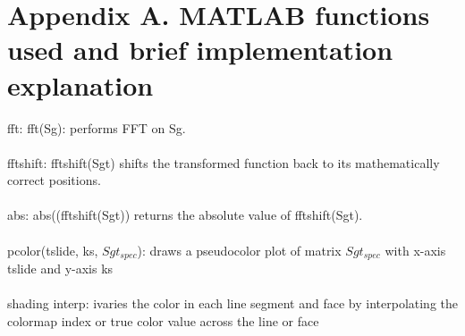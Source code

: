 \documentclass[12pt,letterpaper]{article}
\begin{document}
\section*{Appendix A. MATLAB functions used and brief implementation explanation}
fft: fft(Sg): performs FFT on Sg.
\\
\\fftshift: fftshift(Sgt) shifts the transformed function back to its mathematically correct
positions.
\\
\\abs:  abs((fftshift(Sgt)) returns the absolute value of fftshift(Sgt). 
\\
\\pcolor(tslide, ks, $Sgt_{spec}$): draws a pseudocolor plot of matrix $Sgt_{spec}$ with x-axis tslide and y-axis ks
\\
\\shading interp: ivaries the color in each line segment and face by interpolating the colormap index or true color value across the line or face

\newpage
\end{document}
